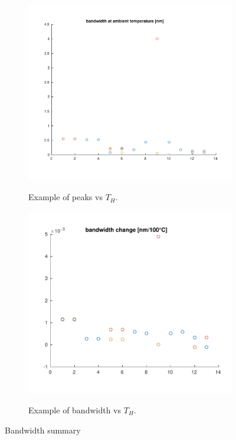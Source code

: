 \documentclass[12pt,a4paper,twoside]{article}
\begin{document}
\begin{figure}[h!]
	\centering
	\begin{subfigure}[b]{0.45\textwidth}
		\includegraphics[width=1\textwidth]{baat2.pdf}
		\label{fig_sym_b@t2} %
		\caption{Example of peaks vs $T_H$.}
	\end{subfigure}\hspace{.05\textwidth}
	\begin{subfigure}[b]{0.45\textwidth}
		\includegraphics[width=1\textwidth]{bc2.pdf}
		\label{fig_sym_bc2} %
		\caption{Example of bandwidth vs $T_H$.}
	\end{subfigure}
	\caption{Bandwidth summary}
	\label{fig_sym_bw}
\end{figure}
\end{document}
